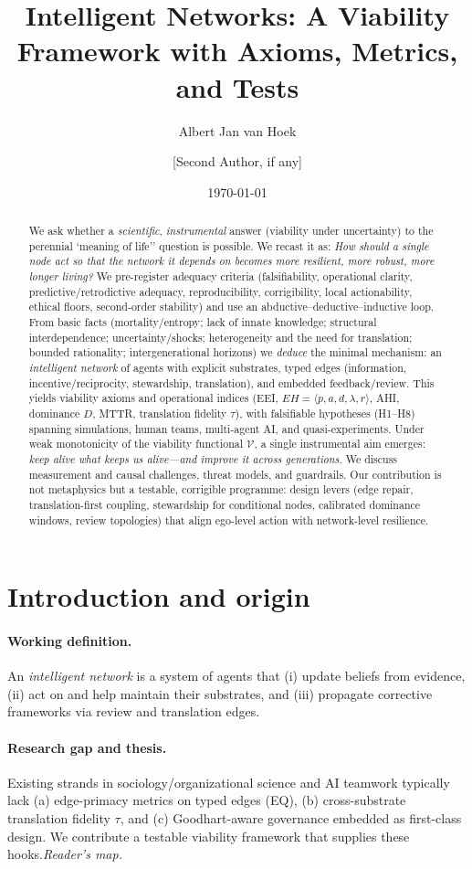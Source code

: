 \documentclass[12pt]{article}
\title{Intelligent Networks: A Viability Framework with Axioms, Metrics, and Tests}
\author{Albert Jan van Hoek 
\and [Second Author, if any]}
\date{\today}
\begin{document}
 

\renewcommand{\arraystretch}{1.2} \setlength{\tabcolsep}{6pt} \maketitle \begin{abstract}We ask whether a \emph{scientific}, \emph{instrumental} answer (viability under uncertainty) to the perennial `meaning of life'' question is possible. We recast it as: \emph{How should a single node act so that the network it depends on becomes more resilient, more robust, more longer living?} We pre-register adequacy criteria (falsifiability, operational clarity, predictive/retrodictive adequacy, reproducibility, corrigibility, local actionability, ethical floors, second-order stability) and use an abductive--deductive--inductive loop. From basic facts (mortality/entropy; lack of innate knowledge; structural interdependence; uncertainty/shocks; heterogeneity and the need for translation; bounded rationality; intergenerational horizons) we \emph{deduce} the minimal mechanism: an \emph{intelligent network} of agents with explicit substrates, typed edges (information, incentive/reciprocity, stewardship, translation), and embedded feedback/review. This yields viability axioms and operational indices (EEI, $EH=\langle p,a,d,\lambda,r\rangle$, AHI, dominance $D$, MTTR, translation fidelity $\tau$), with falsifiable hypotheses (H1--H8) spanning simulations, human teams, multi-agent AI, and quasi-experiments. Under weak monotonicity of the viability functional $\mathcal V$, a single instrumental aim emerges: \emph{keep alive what keeps us alive---and improve it across generations}. We discuss measurement and causal challenges, threat models, and guardrails. Our contribution is not metaphysics but a testable, corrigible programme: design levers (edge repair, translation-first coupling, stewardship for conditional nodes, calibrated dominance windows, review topologies) that align ego-level action with network-level resilience.\end{abstract} \section{Introduction and origin} \n\paragraph{Working definition.} An \emph{intelligent network} is a system of agents that (i) update beliefs from evidence, (ii) act on and help maintain their substrates, and (iii) propagate corrective frameworks via review and translation edges.\n\n\paragraph{Research gap and thesis.} Existing strands in sociology/organizational science and AI teamwork typically lack (a) edge-primacy metrics on typed edges (EQ), (b) cross-substrate translation fidelity $\tau$, and (c) Goodhart-aware governance embedded as first-class design. We contribute a testable viability framework that supplies these hooks.\n\n\emph{Reader's map.} 
\end{document}
